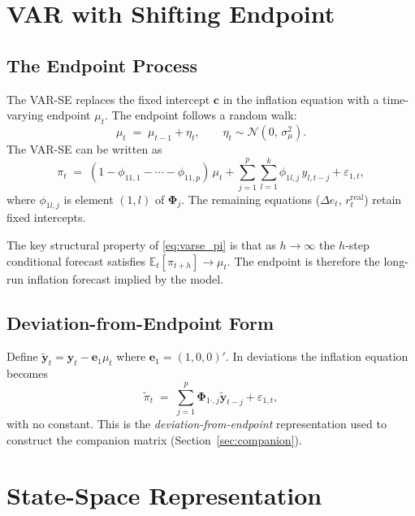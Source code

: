 \documentclass[12pt, a4paper]{article}
\newcommand{\E}{\mathbb{E}}
\newcommand{\bs}[1]{\boldsymbol{#1}}
\begin{document}
\section{VAR with Shifting Endpoint}
\label{sec:varse}

\subsection{The Endpoint Process}

The VAR-SE replaces the fixed intercept $\bs{c}$ in the inflation equation
with a time-varying endpoint $\mu_t$. The endpoint follows a random walk:
\begin{equation}
    \mu_t \;=\; \mu_{t-1} + \eta_t, \qquad \eta_t \sim \mathcal{N}(0,\,\sigma^2_\mu).
    \label{eq:mu_rw}
\end{equation}
The VAR-SE can be written as
\begin{equation}
    \pi_t \;=\; (1-\phi_{11,1}-\cdots-\phi_{11,p})\,\mu_t
                + \sum_{j=1}^{p}\sum_{l=1}^{k}\phi_{1l,j}\,y_{l,t-j} + \varepsilon_{1,t},
    \label{eq:varse_pi}
\end{equation}
where $\phi_{1l,j}$ is element $(1,l)$ of $\bs{\Phi}_j$. The remaining
equations ($\Delta e_t$, $r_t^{\mathrm{real}}$) retain fixed intercepts.

The key structural property of \eqref{eq:varse_pi} is that as
$h\to\infty$ the $h$-step conditional forecast satisfies
$\E_t[\pi_{t+h}] \to \mu_t$. The endpoint is therefore the long-run
inflation forecast implied by the model.

\subsection{Deviation-from-Endpoint Form}

Define $\tilde{\bs{y}}_t = \bs{y}_t - \bs{e}_1\mu_t$ where
$\bs{e}_1 = (1,0,0)'$. In deviations the inflation equation becomes
\begin{equation}
    \tilde{\pi}_t \;=\; \sum_{j=1}^{p}\bs{\Phi}_{1\cdot,j}\tilde{\bs{y}}_{t-j}
                        + \varepsilon_{1,t},
\end{equation}
with no constant. This is the \emph{deviation-from-endpoint} representation
used to construct the companion matrix (Section~\ref{sec:companion}).

\section{State-Space Representation}
\label{sec:statespace}
\end{document}
